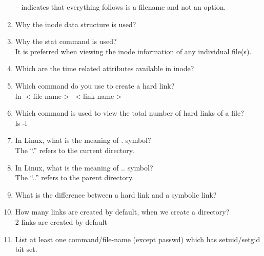 \documentclass[12pt,a4]{article}
\begin{document}
\begin{enumerate}
-- indicates that everything follows is a filename and not an option.
\item  Why the inode data structure is used?
\item Why the stat command is used?\\
It is preferred when viewing the inode
information of any individual file(s).
\item Which are the time related attributes available in inode?
\item  Which command do you use to create a hard link?\\
ln $<$file-name$>$ $<$link-name$>$
\item  Which command is used to view the total number of hard links of a file?\\
ls -l
\item In Linux, what is the meaning of . symbol?\\
The “.” refers to the current directory.

\item In Linux, what is the meaning of .. symbol?\\
The “..” refers to the parent directory.
\item What is the difference between a hard link and a symbolic link?
\item How many links are created by default, when we create a directory?\\
2 links are created by default
\item List at least one command/file-name (except passwd) which has setuid/setgid bit
set.
\end{enumerate}
\end{document}
